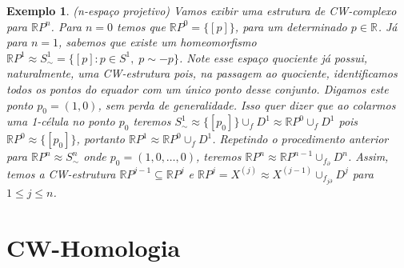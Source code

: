\documentclass[12pt]{book}
\newtheorem{exemplo}[teorema]{Exemplo}
\newcommand{\classe}[1]{[#1]}
\newcommand{\real}[1]{\mathbb{R}^{#1}}
\newcommand{\realprojetivo}[1]{\mathbb{R}P^{#1}}
\newcommand{\skeleton}[1]{X^{(#1)}}
\begin{document}
	\begin{exemplo}
		(n-espaço projetivo) Vamos exibir uma estrutura de CW-complexo para $\realprojetivo{n}$. Para $n=0$ temos que $\realprojetivo{0} = \{\classe{p}\}$, para um determinado $p \in \real{}$. Já para $n=1$, sabemos que existe um homeomorfismo $\realprojetivo{1} \approx S^{1}_{\sim} = \{\classe{p}: p \in S^{1},\; p \sim -p\}$. Note esse espaço quociente já possui, naturalmente, uma CW-estrutura pois, na passagem ao quociente, identificamos todos os pontos do equador com um único ponto desse conjunto. Digamos este ponto $p_{0} = (1,0)$, sem perda de generalidade. Isso quer dizer que ao colarmos uma 1-célula no ponto $p_{0}$ teremos $S^{1}_{\sim} \approx \{[p_{0}]\} \cup_{f}D^{1} \approx \realprojetivo{0}\cup_{f}D^{1} $ pois $\realprojetivo{0} \approx \{[p_{0}]\}$, portanto $ \realprojetivo{1} \approx \realprojetivo{0}\cup_{f}D^{1}$. Repetindo o procedimento anterior para $\realprojetivo{n} \approx S^{n}_{\sim} $ onde $p_{0} = (1,0,\dots, 0)$, teremos $\realprojetivo{n} \approx \realprojetivo{n-1} \cup_{f_{\partial}}D^{n}$. Assim, temos a CW-estrutura $\realprojetivo{j-1} \subseteq \realprojetivo{j}$ e $\realprojetivo{j} = \skeleton{j} \approx \skeleton{j-1}\cup_{f_{j\partial}}D^{j}$ para $1\leq j \leq n$.
	\end{exemplo}
	
	\section{CW-Homologia}
	
\end{document}
